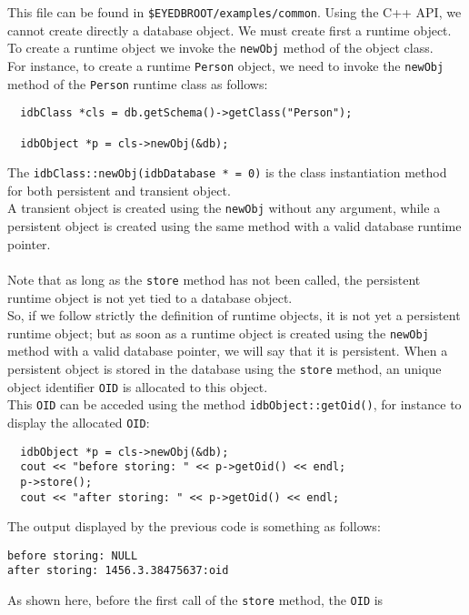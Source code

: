 \normalsize
This file can be found in \texttt{\$EYEDBROOT/examples/common}.
Using the C++ API, we cannot create directly a database object.
We must create first a runtime object.
\\
To create a runtime object we invoke the \texttt{newObj} method
of the object class.
\\
For instance, to create a runtime \texttt{Person} object, we need
to invoke the \texttt{newObj} method of the \texttt{Person} runtime class
as follows:
\verbsize
\begin{verbatim}
  idbClass *cls = db.getSchema()->getClass("Person");

  idbObject *p = cls->newObj(&db);
\end{verbatim}
\normalsize
The \texttt{idbClass::newObj(idbDatabase * = 0)} is the class instantiation
method for both persistent and transient object.
\\
A transient object is created using the \texttt{newObj} without any argument,
while a persistent object is created using the same method with
a valid database runtime pointer.
\\
\\
Note that as long as the \texttt{store} method has not been called,
the persistent runtime object is not yet tied to a database object.
\\
So, if we follow strictly the definition of runtime objects,
it is not yet a persistent runtime object; but as soon as a runtime
object is created using the \texttt{newObj} method with a valid database
pointer, we will say that it is persistent.
When a persistent object is stored in the database using the
\texttt{store} method, an unique object identifier \texttt{OID} is allocated
to this object.
\\
This \texttt{OID} can be acceded using the method \texttt{idbObject::getOid()},
for instance to display the allocated \texttt{OID}:
\verbsize
\begin{verbatim}
  idbObject *p = cls->newObj(&db);
  cout << "before storing: " << p->getOid() << endl;
  p->store();
  cout << "after storing: " << p->getOid() << endl;
\end{verbatim}
\normalsize
The output displayed by the previous code is something as follows:
\verbsize
\begin{verbatim}
before storing: NULL
after storing: 1456.3.38475637:oid
\end{verbatim}
\normalsize
As shown here, before the first call of the \texttt{store} method, the \texttt{OID} is

